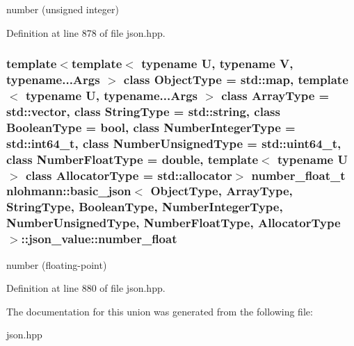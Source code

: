 number (unsigned integer) 



Definition at line 878 of file json.\+hpp.

\hypertarget{unionnlohmann_1_1basic__json_1_1json__value_acdedc3de7fbc1ae912f5918730658ec0}{}
\subsubsection[{number\+\_\+float}]{\setlength{\rightskip}{0pt plus 5cm}template$<$template$<$ typename U, typename V, typename...\+Args $>$ class Object\+Type = std\+::map, template$<$ typename U, typename...\+Args $>$ class Array\+Type = std\+::vector, class String\+Type  = std\+::string, class Boolean\+Type  = bool, class Number\+Integer\+Type  = std\+::int64\+\_\+t, class Number\+Unsigned\+Type  = std\+::uint64\+\_\+t, class Number\+Float\+Type  = double, template$<$ typename U $>$ class Allocator\+Type = std\+::allocator$>$ {\bf number\+\_\+float\+\_\+t} {\bf nlohmann\+::basic\+\_\+json}$<$ Object\+Type, Array\+Type, String\+Type, Boolean\+Type, Number\+Integer\+Type, Number\+Unsigned\+Type, Number\+Float\+Type, Allocator\+Type $>$\+::json\+\_\+value\+::number\+\_\+float}\label{unionnlohmann_1_1basic__json_1_1json__value_acdedc3de7fbc1ae912f5918730658ec0}


number (floating-\/point) 



Definition at line 880 of file json.\+hpp.



The documentation for this union was generated from the following file\+:\begin{DoxyCompactItemize}
\item 
json.\+hpp\end{DoxyCompactItemize}
